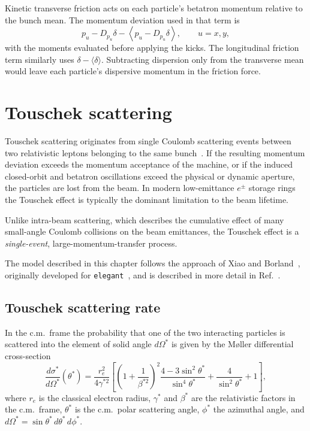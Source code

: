 Kinetic transverse friction acts on each particle's betatron momentum
relative to the bunch mean. The momentum deviation used in that term is
\begin{equation}
    p_u - D_{p_u}\delta - \left\langle p_u-D_{p_u}\delta\right\rangle,
    \qquad u=x,y,
\end{equation}
with the moments evaluated before applying the kicks. The longitudinal
friction term similarly uses \(\delta-\langle\delta\rangle\).
Subtracting dispersion only from the transverse mean would leave each
particle's dispersive momentum in the friction force.


\chapter{Touschek scattering}
\label{chapter:touschek}

Touschek scattering originates from single Coulomb scattering events between two
relativistic leptons belonging to the same bunch~\cite{PRL:Bernardini:TouschekAdA}.
If the resulting momentum deviation exceeds the momentum acceptance of
the machine, or if the induced closed-orbit and betatron oscillations exceed the
physical or dynamic aperture, the particles are lost from the beam. In modern
low-emittance $e^{\pm}$ storage rings the Touschek effect is typically the
dominant limitation to the beam lifetime.

Unlike intra-beam scattering, which describes the cumulative effect of many
small-angle Coulomb collisions on the beam emittances,
the Touschek effect is a \emph{single-event}, large-momentum-transfer process.

The model described in this chapter follows the approach of Xiao and
Borland~\cite{PRSTAB:Xiao:TouschekMonteCarlo}, originally developed for
\texttt{elegant}~\cite{Borland:elegant}, and is described in more detail in
Ref.~\cite{Broggi:PhDthesis}.

\section{Touschek scattering rate}
\label{section:touschek_scattering_rate}

In the c.m.\ frame the probability that one of the two interacting particles is
scattered into the element of solid angle $d\Omega^*$ is given by the M\o ller
differential cross-section~\cite{Moller:1932,PRSTAB:Xiao:TouschekMonteCarlo}
\begin{equation}
    \frac{d\sigma^{*}}{d\Omega^{*}}(\theta^{*})
    = \frac{r_{e}^{2}}{4 \gamma^{*2}}
    \left[
    \left( 1 + \frac{1}{\beta^{*2}} \right)^{2}
    \frac{4 - 3 \sin^{2}\theta^{*}}{\sin^{4}\theta^{*}}
    + \frac{4}{\sin^{2}\theta^{*}} + 1
    \right] ,
    \label{eq:touschek_moller}
\end{equation}
where $r_e$ is the classical electron radius, $\gamma^*$ and $\beta^*$ are the
relativistic factors in the c.m.\ frame, $\theta^*$ is the c.m.\ polar scattering
angle, $\phi^*$ the azimuthal angle, and
$d\Omega^* = \sin\theta^*\, d\theta^*\, d\phi^*$.

